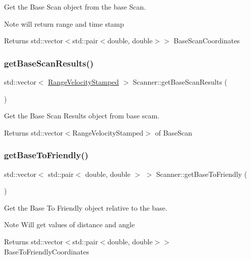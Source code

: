 Get the Base Scan object from the base Scan. 

\begin{DoxyNote}{Note}
will return range and time stamp 
\end{DoxyNote}
\begin{DoxyReturn}{Returns}
std\+::vector$<$std\+::pair$<$double, double$>$$>$ Base\+Scan\+Coordinates 
\end{DoxyReturn}
\mbox{\label{classScanner_a59590dd900ab1c5cc362fa4a00df533d}} 
\subsubsection{\texorpdfstring{get\+Base\+Scan\+Results()}{getBaseScanResults()}}
{\footnotesize\ttfamily std\+::vector$<$ \hyperlink{structRangeVelocityStamped}{Range\+Velocity\+Stamped} $>$ Scanner\+::get\+Base\+Scan\+Results (\begin{DoxyParamCaption}{ }\end{DoxyParamCaption})}



Get the Base Scan Results object from base scam. 

\begin{DoxyReturn}{Returns}
std\+::vector$<$\+Range\+Velocity\+Stamped$>$ of Base\+Scan 
\end{DoxyReturn}
\mbox{\label{classScanner_a5b8ec13e023aef168abc91716d22bbb2}} 
\subsubsection{\texorpdfstring{get\+Base\+To\+Friendly()}{getBaseToFriendly()}}
{\footnotesize\ttfamily std\+::vector$<$ std\+::pair$<$ double, double $>$ $>$ Scanner\+::get\+Base\+To\+Friendly (\begin{DoxyParamCaption}{ }\end{DoxyParamCaption})}



Get the Base To Friendly object relative to the base. 

\begin{DoxyNote}{Note}
Will get values of distance and angle 
\end{DoxyNote}
\begin{DoxyReturn}{Returns}
std\+::vector$<$std\+::pair$<$double, double$>$$>$ Base\+To\+Friendly\+Coordinates 
\end{DoxyReturn}
\mbox{\label{classScanner_a222da6748f943d345a926d5a7094795e}} 
